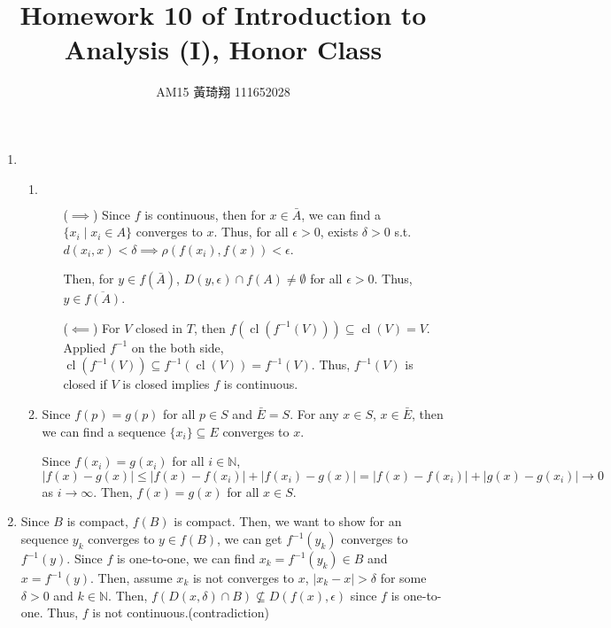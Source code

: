 \documentclass[12pt]{article}
\title{Homework 10 of Introduction to Analysis (I), Honor Class}
\author{AM15 黃琦翔 111652028}
\DeclareMathOperator{\closure}{cl}
\begin{document}
\maketitle
\begin{enumerate}
    \item \begin{enumerate}
        \item $\ $
        \begin{enumerate}
            \item[($\implies$)] Since $f$ is continuous, then for $x\in \bar{A}$, 
            we can find a $\lbrace x_i\mid x_i\in A\rbrace$ converges to $x$.
            Thus, for all $\epsilon > 0$, exists $\delta > 0$ s.t. $d(x_i, x) < \delta \implies \rho(f(x_i), f(x)) < \epsilon$.

            Then, for $y \in f(\bar{A})$, $D(y, \epsilon)\cap f(A) \neq \emptyset$ for all $\epsilon > 0$.
            Thus, $y \in \overline{f(A)}$.
            
            \item[($\impliedby$)] For $V$ closed in $T$, then $f(\closure(f^{-1}(V))) \subseteq \closure(V) = V$.
            Applied $f^{-1}$ on the both side, $\closure(f^{-1}(V)) \subseteq f^{-1}(\closure(V)) = f^{-1}(V)$.
            Thus, $f^{-1}(V)$ is closed if $V$ is closed implies $f$ is continuous.           

        \end{enumerate}

        \item Since $f(p) = g(p)$ for all $p \in S$ and $\bar{E} = S$.
        For any $x\in S$, $x\in \bar{E}$, then we can find a sequence $\lbrace x_i\rbrace\subseteq E$ converges to $x$.

        Since $f(x_i) = g(x_i)$ for all $i\in \mathbb{N}$, $|f(x) - g(x)| \leq |f(x) - f(x_i)| + |f(x_i) - g(x)| = |f(x) - f(x_i)| + |g(x)- g(x_i)| \to 0$ as $i\to \infty$.
        Then, $f(x) = g(x)$ for all $x\in S$.
    \end{enumerate}

    \item Since $B$ is compact, $f(B)$ is compact.
    Then, we want to show for an sequence $y_k$ converges to $y\in f(B)$,
    we can get $f^{-1}(y_k)$ converges to $f^{-1}(y)$.
    Since $f$ is one-to-one, we can find $x_k = f^{-1}(y_k)\in B$ and $x = f^{-1}(y)$.
    Then, assume $x_k$ is not converges to $x$, 
    $|x_k -x| > \delta$ for some $\delta > 0$ and $k\in \mathbb{N}$.
    Then, $f(D(x, \delta)\cap B) \not\subseteq D(f(x), \epsilon)$ since $f$ is one-to-one.
    Thus, $f$ is not continuous.(contradiction)


\end{enumerate}
\end{document}
